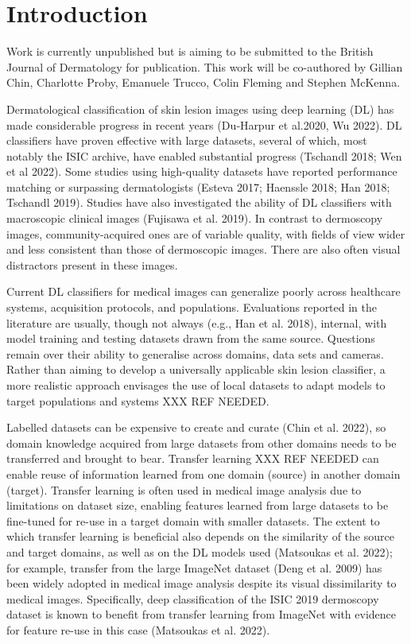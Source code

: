 \section{Introduction}
\label{sec:generalisation_intro}
Work is currently unpublished but is aiming to be submitted to the British Journal of Dermatology for publication. This work will be co-authored by Gillian Chin, Charlotte Proby, Emanuele Trucco, Colin Fleming and Stephen McKenna.

Dermatological classification of skin lesion images using deep learning (DL) has made considerable progress in recent years (Du‐Harpur et al.2020, Wu 2022). DL classifiers have proven effective with large datasets, several of which, most notably the ISIC archive, have enabled substantial progress (Tschandl 2018; Wen et al 2022). Some studies using high-quality datasets have reported performance matching or surpassing dermatologists (Esteva 2017; Haenssle 2018; Han 2018; Tschandl 2019). Studies have also investigated the ability of DL classifiers with macroscopic clinical images (Fujisawa et al. 2019). In contrast to dermoscopy images, community-acquired ones are of variable quality, with fields of view wider and less consistent than those of dermoscopic images. There are also often visual distractors present in these images.

Current DL classifiers for medical images can generalize poorly across healthcare systems, acquisition protocols, and populations. Evaluations reported in the literature are usually, though not always (e.g., Han et al. 2018), internal, with model training and testing datasets drawn from the same source. Questions remain over their ability to generalise across domains, data sets and cameras. Rather than aiming to develop a universally applicable skin lesion classifier, a more realistic approach envisages the use of local datasets to adapt models to target populations and systems XXX REF NEEDED. 

Labelled datasets can be expensive to create and curate (Chin et al. 2022), so domain knowledge acquired from large datasets from other domains needs to be transferred and brought to bear. Transfer learning XXX REF NEEDED can enable reuse of information learned from one domain (source) in another domain (target). Transfer learning is often used in medical image analysis due to limitations on dataset size, enabling features learned from large datasets to be fine-tuned for re-use in a target domain with smaller datasets. The extent to which transfer learning is beneficial also depends on the similarity of the source and target domains, as well as on the DL models used (Matsoukas et al. 2022); for example, transfer from the large ImageNet dataset (Deng et al. 2009) has been widely adopted in medical image analysis despite its visual dissimilarity to medical images. Specifically, deep classification of the ISIC 2019 dermoscopy dataset is known to benefit from transfer learning from ImageNet with evidence for feature re-use in this case (Matsoukas et al. 2022). 

